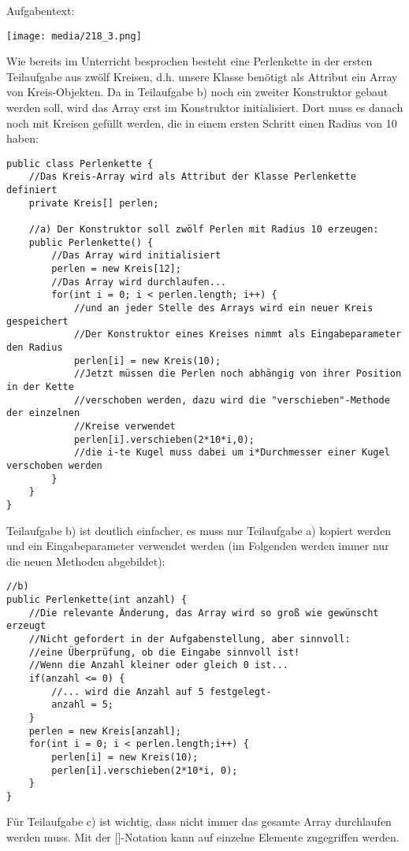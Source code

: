 \documentclass{article}
\begin{document}
\thispagestyle{firstpage}
\setlength{\headsep}{12pt}
Aufgabentext:
\begin{center}
    \texttt{[image: media/218\_3.png]}
\end{center}
Wie bereits im Unterricht besprochen besteht eine Perlenkette in der ersten Teilaufgabe aus zwölf Kreisen, d.h. unsere Klasse benötigt als Attribut ein Array von Kreis-Objekten. Da in Teilaufgabe b) noch ein zweiter Konstruktor gebaut werden soll, wird das Array erst im Konstruktor initialisiert. Dort muss es danach noch mit Kreisen gefüllt werden, die in einem ersten Schritt einen Radius von 10 haben:
\begin{verbatim}
public class Perlenkette {
    //Das Kreis-Array wird als Attribut der Klasse Perlenkette definiert
    private Kreis[] perlen;

    //a) Der Konstruktor soll zwölf Perlen mit Radius 10 erzeugen:
    public Perlenkette() {
        //Das Array wird initialisiert
        perlen = new Kreis[12];
        //Das Array wird durchlaufen...
        for(int i = 0; i < perlen.length; i++) {
            //und an jeder Stelle des Arrays wird ein neuer Kreis gespeichert
            //Der Konstruktor eines Kreises nimmt als Eingabeparameter den Radius
            perlen[i] = new Kreis(10);
            //Jetzt müssen die Perlen noch abhängig von ihrer Position in der Kette
            //verschoben werden, dazu wird die "verschieben"-Methode der einzelnen 
            //Kreise verwendet
            perlen[i].verschieben(2*10*i,0);
            //die i-te Kugel muss dabei um i*Durchmesser einer Kugel verschoben werden
        }
    }
}
\end{verbatim}
Teilaufgabe b) ist deutlich einfacher, es muss nur Teilaufgabe a) kopiert werden und ein Eingabeparameter verwendet werden (im Folgenden werden immer nur die neuen Methoden abgebildet):
\begin{verbatim}
//b)
public Perlenkette(int anzahl) {
    //Die relevante Änderung, das Array wird so groß wie gewünscht erzeugt
    //Nicht gefordert in der Aufgabenstellung, aber sinnvoll: 
    //eine Überprüfung, ob die Eingabe sinnvoll ist! 
    //Wenn die Anzahl kleiner oder gleich 0 ist...
    if(anzahl <= 0) {
        //... wird die Anzahl auf 5 festgelegt-
        anzahl = 5;
    }
    perlen = new Kreis[anzahl];
    for(int i = 0; i < perlen.length;i++) {
        perlen[i] = new Kreis(10);
        perlen[i].verschieben(2*10*i, 0);
    }
}
\end{verbatim}
Für Teilaufgabe c) ist wichtig, dass nicht immer das gesamte Array durchlaufen werden muss. Mit der []-Notation kann auf einzelne Elemente zugegriffen werden. \\
\end{document}
